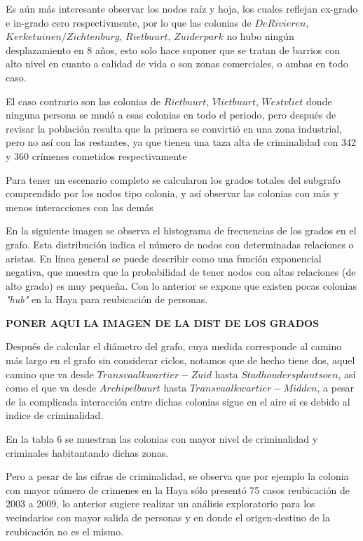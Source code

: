 \documentclass[letterpaper, 10 pt, conference]{ieeeconf}  %
\begin{document}
Es a\'un m\'as interesante observar los nodos ra\'iz y hoja, los cuales reflejan ex-grado e in-grado cero respectivmente, por lo que las colonias de $De Rivieren$, $Kerketuinen/Zichtenburg$, $Rietbuurt$, $Zuiderpark$ no hubo ning\'un desplazamiento en 8 a\~nos, esto solo hace suponer que se tratan de barrios con alto nivel en cuanto a calidad de vida o son zonas comerciales, o ambas en todo caso.

El caso contrario son las colonias de $Rietbuurt$, $Vlietbuurt$, $Westvliet$ donde ninguna persona se mud\'o a esas colonias en todo el periodo, pero despu\'es de revisar la poblaci\'on resulta que la primera se convirti\'o en una zona industrial, pero no as\'i con las restantes, ya que tienen una taza alta de criminalidad con 342 y 360 cr\'imenes cometidos respectivamente

Para tener un escenario completo se calcularon los grados totales del subgrafo comprendido por los nodos tipo colonia, y as\'i observar las colonias con m\'as y menos interacciones con las dem\'as



En la siguiente imagen se observa el histograma de frecuencias de los grados en el grafo. Esta distribuci\'on indica el n\'umero de nodos con determinadas relaciones o aristas. En l\'inea general se puede describir como una funci\'on exponencial negativa, que muestra que la probabilidad de tener nodos con altas relaciones (de alto grado) es muy peque\~na. Con lo anterior se expone que existen pocas colonias \textit{"hub"} en la Haya para reubicaci\'on de personas.

\textbf{PONER AQUI LA IMAGEN DE LA DIST DE LOS GRADOS}

Despu\'es de calcular el di\'ametro del grafo, cuya medida corresponde al camino m\'as largo en el grafo sin considerar ciclos, notamos que de hecho tiene dos, aquel camino que va desde $Transvaalkwartier-Zuid$ hasta $Stadhoudersplantsoen$, as\'i como el que va desde $Archipelbuurt$ hasta $Transvaalkwartier-Midden$, a pesar de la complicada interacci\'on entre dichas colonias sigue en el aire si es debido al indice de criminalidad.

En la tabla 6 se muestran las colonias con mayor nivel de criminalidad y criminales habitantando dichas zonas. 



Pero a pesar de las cifras de criminalidad, se observa que por ejemplo la colonia con mayor n\'umero de crimenes en la Haya s\'olo present\'o 75 casos reubicaci\'on de 2003 a 2009, lo anterior sugiere realizar un an\'alisis exploratorio para los vecindarios con mayor salida de personas y en donde el origen-destino de la reubicaci\'on no es el mismo.
\end{document}
